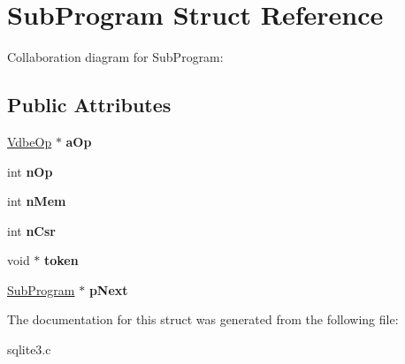 \hypertarget{structSubProgram}{}\section{Sub\+Program Struct Reference}
\label{structSubProgram}


Collaboration diagram for Sub\+Program\+:
\subsection*{Public Attributes}
\begin{DoxyCompactItemize}
\item 
\hyperlink{structVdbeOp}{Vdbe\+Op} $\ast$ {\bfseries a\+Op}\hypertarget{structSubProgram_aa9bb1992fed633d182076a35d6448c7d}{}\label{structSubProgram_aa9bb1992fed633d182076a35d6448c7d}

\item 
int {\bfseries n\+Op}\hypertarget{structSubProgram_a6fe204a75ab8254c453be77f024b6d69}{}\label{structSubProgram_a6fe204a75ab8254c453be77f024b6d69}

\item 
int {\bfseries n\+Mem}\hypertarget{structSubProgram_a9bece42fdeb81085809d7c2f8aa05616}{}\label{structSubProgram_a9bece42fdeb81085809d7c2f8aa05616}

\item 
int {\bfseries n\+Csr}\hypertarget{structSubProgram_a83b18aa5cc63aecdbf996c16af1e48bb}{}\label{structSubProgram_a83b18aa5cc63aecdbf996c16af1e48bb}

\item 
void $\ast$ {\bfseries token}\hypertarget{structSubProgram_aaea3b67899b092476b107d22a4e2022d}{}\label{structSubProgram_aaea3b67899b092476b107d22a4e2022d}

\item 
\hyperlink{structSubProgram}{Sub\+Program} $\ast$ {\bfseries p\+Next}\hypertarget{structSubProgram_a7da35488ac58a64fa30b88da56aac8b3}{}\label{structSubProgram_a7da35488ac58a64fa30b88da56aac8b3}

\end{DoxyCompactItemize}


The documentation for this struct was generated from the following file\+:\begin{DoxyCompactItemize}
\item 
sqlite3.\+c\end{DoxyCompactItemize}
